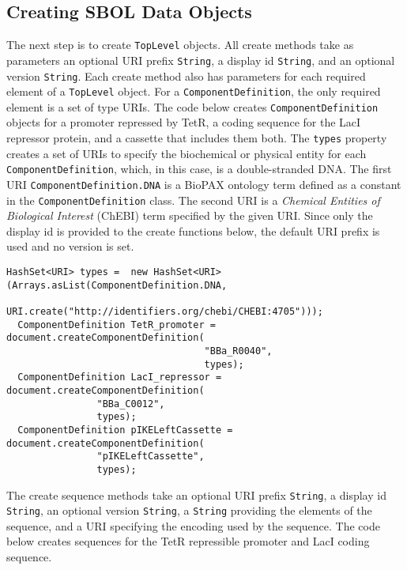 \subsection*{Creating SBOL Data Objects}

The next step is to create \lstinline+TopLevel+ objects.  All create methods take as parameters an optional URI prefix \lstinline+String+, a display id \lstinline+String+, and an optional version \lstinline+String+.  Each create method also has parameters for each required element of a \lstinline+TopLevel+ object.  For a \lstinline+ComponentDefinition+, the only required element is a set of type URIs.  The code below creates \lstinline+ComponentDefinition+ objects for a promoter repressed by TetR, a coding sequence for the LacI repressor protein, and a cassette that includes them both.  The \lstinline+types+ property creates a set of URIs to specify the biochemical or physical entity for each \lstinline+ComponentDefinition+, which, in this case, is a double-stranded DNA. The first URI \lstinline+ComponentDefinition.DNA+ is a BioPAX ontology term defined as a constant in the \lstinline+ComponentDefinition+ class. The second URI is a \emph{Chemical Entities of Biological Interest} (ChEBI) term specified by the given URI.  Since only the display id is provided to the create functions below, the default URI prefix is used and no version is set.

\begin{minipage}{0.95\textwidth} 
\begin{lstlisting}[basicstyle=\footnotesize\ttfamily]
  HashSet<URI> types =  new HashSet<URI>(Arrays.asList(ComponentDefinition.DNA,
                          URI.create("http://identifiers.org/chebi/CHEBI:4705")));
  ComponentDefinition TetR_promoter = document.createComponentDefinition(
                                   "BBa_R0040",
                                   types);
  ComponentDefinition LacI_repressor = document.createComponentDefinition(
				"BBa_C0012", 
				types);
  ComponentDefinition pIKELeftCassette = document.createComponentDefinition(
				"pIKELeftCassette", 
				types);
\end{lstlisting}
\end{minipage}

The create sequence methods take an optional URI prefix \lstinline+String+, a display id \lstinline+String+, an optional version \lstinline+String+, a \lstinline+String+ providing the elements of the sequence, and a URI specifying the encoding used by the sequence.  The code below
creates sequences for the TetR repressible promoter and LacI coding sequence.

